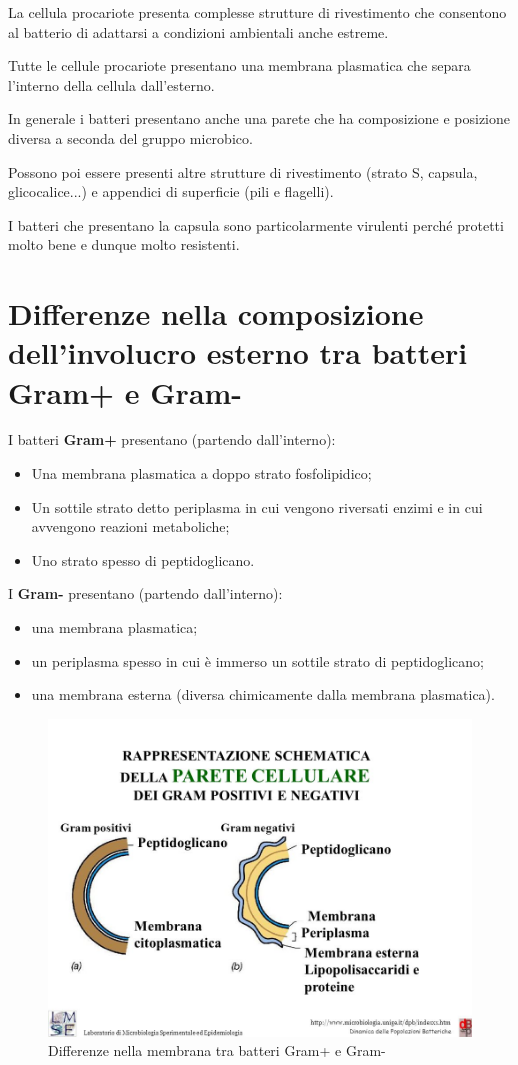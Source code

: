\documentclass[11pt]{book}
\begin{document}
La cellula procariote presenta complesse strutture di rivestimento che consentono al batterio di adattarsi a condizioni ambientali anche estreme.

Tutte le cellule procariote presentano una membrana plasmatica che separa l'interno della cellula dall'esterno. 

In generale i batteri presentano anche una parete che ha composizione e posizione diversa a seconda del gruppo microbico.

Possono poi essere presenti altre strutture di rivestimento (strato S, capsula, glicocalice...) e appendici di superficie (pili e flagelli).

I batteri che presentano la capsula sono particolarmente virulenti perché protetti molto bene e dunque molto resistenti.

\section{Differenze nella composizione dell'involucro esterno tra batteri Gram+ e Gram-}
I batteri \textbf{Gram+} presentano (partendo dall'interno):
\begin{itemize}
\item Una membrana plasmatica a doppo strato fosfolipidico;
\item Un sottile strato detto periplasma in cui vengono riversati enzimi e in cui avvengono reazioni metaboliche;
\item Uno strato spesso di peptidoglicano.
\end{itemize}

I \textbf{Gram-} presentano (partendo dall'interno):
\begin{itemize}
\item una membrana plasmatica;
\item un periplasma spesso in cui è immerso un sottile strato di peptidoglicano;
\item una membrana esterna (diversa chimicamente dalla membrana plasmatica).
\end{itemize}

\begin{figure}[htp]
\centering
\includegraphics[scale=0.40]{img/Parete_cellulare.jpg}
\caption{Differenze nella membrana tra batteri Gram+ e Gram-}
\label{parete_cellulare}
\end{figure}
\end{document}
